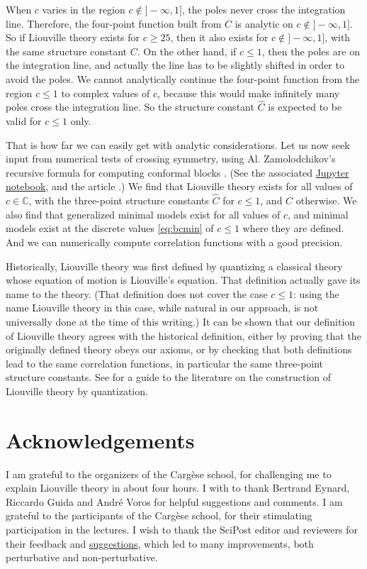 \documentclass[12pt, a4paper]{article}
\theoremstyle{break}
\begin{document}
When $c$ varies in the region $c\notin ]-\infty,1]$, the poles never cross the integration line.
Therefore, 
the four-point function built from $C$ is analytic on $c\notin ]-\infty,1]$. 
So if Liouville theory exists for $c\geq 25$, then it also exists for $c\notin ]-\infty,1]$, with the same structure constant $C$. 
On the other hand, if $c\leq 1$, then the poles are on the integration line, and actually the line
has to be slightly shifted in order to avoid the poles. 
We cannot analytically continue the four-point function from the region $c\leq 1$ to complex values of $c$, because this would make infinitely many poles cross the integration line.
So the structure constant $\hat C$ is expected to be valid for $c\leq 1$ only.

That is how far we can easily get with analytic considerations. 
Let us now seek input from numerical tests of crossing symmetry, using Al. Zamolodchikov's recursive formula for computing conformal blocks \cite{zz90}. (See the associated \href{https://github.com/ribault/bootstrap-2d-Python/blob/master/Liouville_demo_2.ipynb}{Jupyter notebook}, and the article \cite{rs15}.)
We find that Liouville theory exists for all values of $c\in\mathbb{C}$, with the three-point structure constants $\hat C$ for $c\leq 1$, and $C$ otherwise.
We also find that generalized minimal models exist for all values of $c$, and minimal models exist at the discrete values \eqref{eq:bcmin} of $c\leq 1$ where they are defined. 
And we can numerically compute correlation functions with a good precision.

Historically, Liouville theory was first defined by quantizing a classical theory whose equation of motion is Liouville's equation. That definition actually gave its name to the theory. (That definition does not cover the case $c\leq 1$: using the name Liouville theory in this case, while natural in our approach, is not universally done at the time of this writing.) It can be shown that our definition of Liouville theory agrees with the historical definition, either by proving that the originally defined theory obeys our axioms, or by checking that both definitions lead to the same correlation functions, in particular the same three-point structure constants. See \cite{tes17} for a guide to the literature on the construction of Liouville theory by quantization. 

\section*{Acknowledgements}

I am grateful to the organizers of the Carg\`ese school, for challenging me to explain Liouville theory in about four hours.
I with to thank Bertrand Eynard, Riccardo Guida and Andr\'e Voros for helpful suggestions and comments.
I am grateful to the participants of the Carg\`ese school, for their stimulating participation in the lectures.
I wish to thank the SciPost editor and reviewers for their feedback and \href{https://scipost.org/submission/1609.09523v2/}{suggestions}, which led to many improvements, both perturbative and non-perturbative.




%
\end{document}
